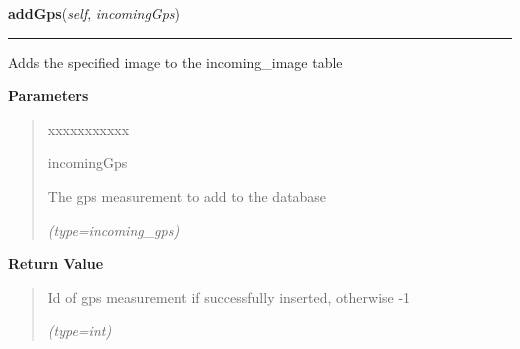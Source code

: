 \hspace{.8\funcindent}\begin{boxedminipage}{\funcwidth}

    \raggedright \textbf{addGps}(\textit{self}, \textit{incomingGps})

    \vspace{-1.5ex}

    \rule{\textwidth}{0.5\fboxrule}
\setlength{\parskip}{2ex}
    Adds the specified image to the incoming\_image table

\setlength{\parskip}{1ex}
      \textbf{Parameters}
      \vspace{-1ex}

      \begin{quote}
        \begin{Ventry}{xxxxxxxxxxx}

          \item[incomingGps]

          The gps measurement to add to the database

            {\it (type=incoming\_gps)}

        \end{Ventry}

      \end{quote}

      \textbf{Return Value}
    \vspace{-1ex}

      \begin{quote}
      Id of gps measurement if successfully inserted, otherwise -1

      {\it (type=int)}

      \end{quote}

    \end{boxedminipage}

    \label{src:dao:incoming_gps_dao:IncomingGpsDAO:getGpsById}

    \vspace{0.5ex}

